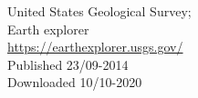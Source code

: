 \documentclass[11pt, A4paper, english]{article}
\begin{document}
\begin{multicols}{2}
		\begin{thebibliography}{9}
United States Geological Survey; \\
Earth explorer \\
\url{https://earthexplorer.usgs.gov/} \\
Published 23/09-2014 \\
Downloaded 10/10-2020
		\end{thebibliography}
	\end{multicols}
\end{document}
